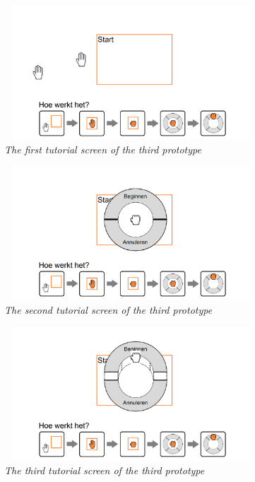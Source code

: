 \begin{figure}[H]
	\begin{center}
		\includegraphics[width=9.5cm, height=5cm]{figures/prototype_7_6_tutorial_1.png}
		\caption{\emph{The first tutorial screen of the third prototype}}
		\label{first tutorial last prototype}
	\end{center}
\end{figure}

\begin{figure}[H]
	\begin{center}
		\includegraphics[width=9.5cm, height=5cm]{figures/prototype_8_6_tutorial_2.png}
		\caption{\emph{The second tutorial screen of the third prototype}}
		\label{second tutorial last prototype}
	\end{center}
\end{figure}

\begin{figure}[H]
	\begin{center}
		\includegraphics[width=9.5cm, height=5cm]{figures/prototype_9_6_tutorial_3.png}
		\caption{\emph{The third tutorial screen of the third prototype}}
		\label{third tutorial last prototype}
	\end{center}
\end{figure}


